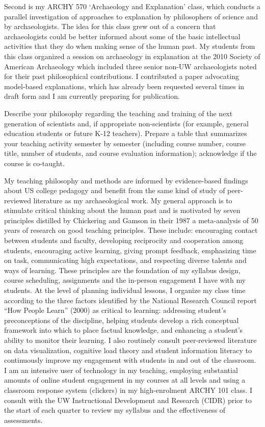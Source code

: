 \documentclass[11pt,article,oneside]{memoir}
\begin{document}
Second is my ARCHY 570 ‘Archaeology and Explanation’ class, which conducts a parallel investigation of approaches to explanation by philosophers of science and by archaeologists. The idea for this class grew out of a concern that archaeologists could be better informed about some of the basic intellectual activities that they do when making sense of the human past. My students from this class organized a session on archaeology in explanation at the 2010 Society of American Archaeology which included three senior non-UW archaeologists noted for their past philosophical contributions. I contributed a paper advocating model-based explanations, which has already been requested several times in draft form and I am currently preparing for publication.



\bigskip     


Describe your philosophy regarding the teaching and training of the next generation of scientists and, if appropriate non-scientists (for example, general education students or future K-12 teachers). Prepare a table that summarizes your teaching activity semester by semester (including course number, course title, number of students, and course evaluation information); acknowledge if the course is co-taught.

My teaching philosophy and methods are informed by evidence-based findings about US college pedagogy and benefit from the same kind of study of peer-reviewed literature as my archaeological work. My general approach is to stimulate critical thinking about the human past and is motivated by seven principles distilled by Chickering and Gamson in their 1987 a meta-analysis of 50 years of research on good teaching principles. These include: encouraging contact between students and faculty, developing reciprocity and cooperation among students, encouraging active learning, giving prompt feedback, emphasizing time on task, communicating high expectations, and respecting diverse talents and ways of learning. These principles are the foundation of my syllabus design, course scheduling, assignments and the in-person engagement I have with my students. At the level of planning individual lessons, I organize my class time according to the three factors identified by the National Research Council report “How People Learn” (2000) as critical to learning: addressing student’s preconceptions of the discipline, helping students develop a rich conceptual framework into which to place factual knowledge, and enhancing a student’s ability to monitor their learning. I also routinely consult peer-reviewed literature on data visualization, cognitive load theory and student information literacy to continuously improve my engagement with students in and out of the classroom. I am an intensive user of technology in my teaching, employing substantial amounts of online student engagement in my courses at all levels and using a classroom response system (clickers) in my high-enrolment ARCHY 101 class. I consult with the UW Instructional Development and Research (CIDR) prior to the start of each quarter to review my syllabus and the effectiveness of assessments. 
\end{document}

